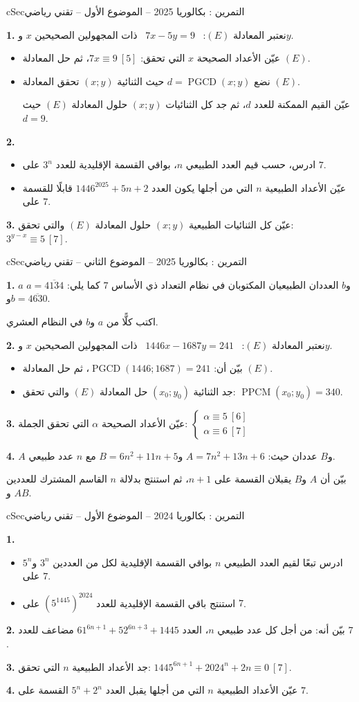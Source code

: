 \documentclass[12pt,a4paper]{article}
\newenvironment{BOX}[2]{\begin{otherlanguage}{english}\begin{arbox}{#1}{#2}}{\end{arbox}\end{otherlanguage}}
\newcounter{exo}
\newenvironment{tamrin}[1]{\stepcounter{exo}\begin{BOX}{cSec}{التمرين \theexo: #1}}{\end{BOX}}
\newcommand{\pgcd}{\operatorname{PGCD}}
\newcommand{\ppcm}{\operatorname{PPCM}}
\newenvironment{sq}{\begin{itemize}[leftmargin=2.4em,itemsep=3pt]}{\end{itemize}}
\newcommand{\qa}{\item[(أ)]}\newcommand{\qb}{\item[(ب)]}\newcommand{\qc}{\item[(جـ)]}\newcommand{\qd}{\item[(د)]}\newcommand{\qe}{\item[(هـ)]}
\newcommand{\QQ}[1]{\par\smallskip\textbf{#1.} }
\begin{document}
\begin{tamrin}{بكالوريا 2025 -- الموضوع الأول -- تقني رياضي}
\QQ{1} نعتبر المعادلة $(E)$: \ $7x-5y=9$ \ ذات المجهولين الصحيحين $x$ و$y$.
\begin{sq}
\qa عيّن الأعداد الصحيحة $x$ التي تحقق: $7x\equiv 9\ [5]$، ثم حل المعادلة $(E)$.
\qb نضع $d=\pgcd(x;y)$ حيث الثنائية $(x;y)$ تحقق المعادلة $(E)$.

عيّن القيم الممكنة للعدد $d$، ثم جد كل الثنائيات $(x;y)$ حلول المعادلة $(E)$ حيث $d=9$.
\end{sq}
\QQ{2}
\begin{sq}
\qa ادرس، حسب قيم العدد الطبيعي $n$، بواقي القسمة الإقليدية للعدد $3^n$ على $7$.
\qb عيّن الأعداد الطبيعية $n$ التي من أجلها يكون العدد $1446^{2025}+5n+2$ قابلًا للقسمة على $7$.
\end{sq}
\QQ{3} عيّن كل الثنائيات الطبيعية $(x;y)$ حلول المعادلة $(E)$ والتي تحقق: $3^{y-x}\equiv 5\ [7]$.
\end{tamrin}

\begin{tamrin}{بكالوريا 2025 -- الموضوع الثاني -- تقني رياضي}
\QQ{1} $a$ و$b$ العددان الطبيعيان المكتوبان في نظام التعداد ذي الأساس $7$ كما يلي: $a=\overline{4134}$ و$b=\overline{4630}$.

اكتب كلًّا من $a$ و$b$ في النظام العشري.
\QQ{2} نعتبر المعادلة $(E)$: \ $1446x-1687y=241$ \ ذات المجهولين الصحيحين $x$ و$y$.
\begin{sq}
\qa بيّن أن: $\pgcd(1446;1687)=241$، ثم حل المعادلة $(E)$.
\qb جد الثنائية $(x_0;y_0)$ حل المعادلة $(E)$ والتي تحقق: $\ppcm(x_0;y_0)=340$.
\end{sq}
\QQ{3} عيّن الأعداد الصحيحة $\alpha$ التي تحقق الجملة: $\begin{cases}\alpha\equiv 5\ [6]\\ \alpha\equiv 6\ [7]\end{cases}$
\QQ{4} $A$ و$B$ عددان حيث: $A=7n^2+13n+6$ و$B=6n^2+11n+5$ مع $n$ عدد طبيعي.

بيّن أن $A$ و$B$ يقبلان القسمة على $n+1$، ثم استنتج بدلالة $n$ القاسم المشترك للعددين $A$ و$B$.
\end{tamrin}

\begin{tamrin}{بكالوريا 2024 -- الموضوع الأول -- تقني رياضي}
\QQ{1}
\begin{sq}
\qa ادرس تبعًا لقيم العدد الطبيعي $n$ بواقي القسمة الإقليدية لكل من العددين $3^n$ و$5^n$ على $7$.
\qb استنتج باقي القسمة الإقليدية للعدد $\left(5^{1445}\right)^{2024}$ على $7$.
\end{sq}
\QQ{2} بيّن أنه: من أجل كل عدد طبيعي $n$، العدد $61^{6n+1}+52^{6n+3}+1445$ مضاعف للعدد $7$.
\QQ{3} جد الأعداد الطبيعية $n$ التي تحقق: $1445^{6n+1}+2024^n+2n\equiv 0\ [7]$.
\QQ{4} عيّن الأعداد الطبيعية $n$ التي من أجلها يقبل العدد $5^n+2^n$ القسمة على $7$.
\end{tamrin}
\end{document}
